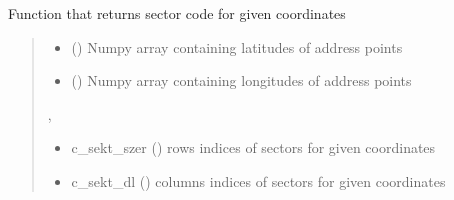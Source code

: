 \documentclass[letterpaper,10pt,english]{sphinxmanual}
\begin{document}

\begin{fulllineitems}
\label{\detokenize{geo_utilities:geo_utilities.get_sector_codes}}
\pysigstartsignatures
{}
\pysigstopsignatures
\sphinxAtStartPar
Function that returns sector code for given coordinates
\begin{quote}\begin{description}
\begin{itemize}
\item {} 
\sphinxAtStartPar
{} () \textendash{} Numpy array containing latitudes of address points

\item {} 
\sphinxAtStartPar
{} () \textendash{} Numpy array containing longitudes of address points

\end{itemize}

\sphinxAtStartPar
\sphinxcode{\sphinxupquote{Tuple}}{[}, \sphinxcode{\sphinxupquote{ndarray}}{]}

\sphinxAtStartPar
\begin{itemize}
\item {} 
\sphinxAtStartPar
c\_sekt\_szer () \sphinxhyphen{} rows indices of sectors for given coordinates

\item {} 
\sphinxAtStartPar
c\_sekt\_dl () \sphinxhyphen{} columns indices of sectors for given coordinates

\end{itemize}


\end{description}\end{quote}

\end{fulllineitems}

\end{document}
